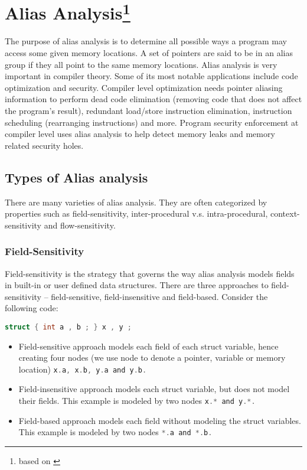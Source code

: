 \newpage

\section{Alias Analysis\footnote{based on \cite{ShengHsi98:online}}}

The purpose of alias analysis is to determine all possible ways a program may access some given
memory locations. A set of pointers are said to be in an alias group if they all point to the same
memory locations.  Alias analysis is very important in compiler theory. Some of its most notable applications
include code optimization and security. Compiler level optimization needs pointer aliasing information to perform dead code elimination (removing code that does not affect the program’s
result), redundant load/store instruction elimination, instruction scheduling (rearranging instructions) and more. Program security enforcement at compiler level uses alias analysis to help detect
memory leaks and memory related security holes.



\subsection{Types of Alias analysis}

There are many varieties of alias analysis. They are often categorized by properties such as
field-sensitivity, inter-procedural v.s. intra-procedural, context-sensitivity and flow-sensitivity.


\subsubsection{Field-Sensitivity}

Field-sensitivity is the strategy that governs the way alias analysis models fields in built-in or
user defined data structures. There are three approaches to field-sensitivity – field-sensitive,
field-insensitive and field-based. Consider the following code:

\lstinline[language=C]|struct { int a , b ; } x , y ;|



\begin{itemize}
\item Field-sensitive approach models each field of each struct variable, hence creating four nodes
(we use node to denote a pointer, variable or memory location)  \lstinline[language=C]|x.a, x.b, y.a and y.b.|

\item Field-insensitive approach models each struct variable, but does not model their fields. This
example is modeled by two nodes  \lstinline[language=C]|x.* and y.*.|

\item Field-based approach models each field without modeling the struct variables. This example
is modeled by two nodes  \lstinline[language=C]|*.a and *.b.|


\end{itemize}    


